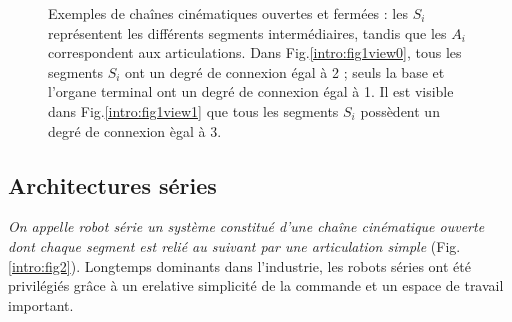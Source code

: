 \begin{figure}[!ht]
  \centering
       \hfill
    \caption{\footnotesize{Exemples de cha\^ines cinématiques ouvertes et fermées : les $S_i$ représentent les différents segments intermédiaires, tandis que les $A_i$ correspondent aux articulations. Dans Fig.\ref{intro:fig1view0}, tous les segments $S_i$ ont un degré de connexion égal à 2 ; seuls la base et l'organe terminal ont un degré de connexion égal à 1. Il est visible dans Fig.\ref{intro:fig1view1} que tous les segments $S_i$ possèdent un degré de connexion ègal à 3.}}
\label{intro:fig1}
\end{figure}

\subsection{Architectures séries}

{\it On appelle robot série un système constitué d'une chaîne cinématique ouverte dont chaque segment est relié au suivant par une articulation simple} (Fig.\ref{intro:fig2}). Longtemps dominants dans l'industrie, les robots séries ont été privilégiés grâce à un erelative simplicité de la commande et un espace de travail important.

